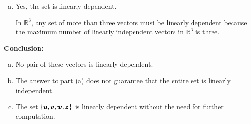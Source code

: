 \begin{solution}
\begin{enumerate}[(a)]
        \item Yes, the set is linearly dependent.
        
        In $\mathbb{R}^3$, any set of more than three vectors must be linearly dependent because the maximum number of linearly independent vectors in $\mathbb{R}^3$ is three.
    \end{enumerate}
        
        
        \textbf{Conclusion:}
        
        \begin{enumerate}[(a)]
            \item No pair of these vectors is linearly dependent.
            \item The answer to part (a) does not guarantee that the entire set is linearly independent.
            \item The set $\{\pmb{u}, \pmb{v}, \pmb{w}, \pmb{z}\}$ is linearly dependent without the need for further computation.
        \end{enumerate}

\end{solution}
